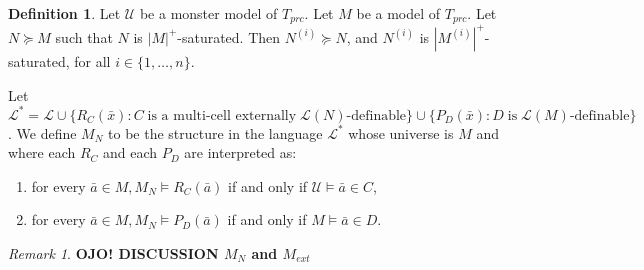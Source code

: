 \documentclass[12pt]{article}
\theoremstyle{definition}
\newtheorem{defi}[thm]{Definition}
\theoremstyle{mystyle}
\theoremstyle{remark}
\newtheorem{rem}[thm]{Remark}
\newcommand{\clos}[2]{#1^{(#2)}}
\begin{document}
\begin{defi} \label{ShelahExpPRC}
Let $\mathcal{U}$ be a monster model of $T_{prc}$. Let $M$ be a
model of $T_{prc}$. Let $N \succeq M$ such that $N$ is
$|M|^+$-saturated. Then $\clos{N}{i}\succeq N$, and $\clos{N}{i}$
is $|\clos{M}{i}|^+$-saturated, for all $i \in \{1, \ldots, n\}$.

Let $\mathcal{L}^* = \mathcal{L} \cup  \{R_C(\bar{x}) : C \; \mbox{is a multi-cell externally} \; \mathcal{L}(N)\mbox{-definable}\} \cup \{P_D(\bar{x}) : D \; \mbox{is} \; \mathcal{L}(M)\mbox{-definable}\}$.
We define $M_N$ to be the structure in the language $\mathcal{L}^*$
whose universe is $M$ and where each $R_C$ and each $P_D$ are interpreted as:
\begin{enumerate}
\item for every $\bar{a} \in M, M_N \models R_C(\bar{a})$ if and only if $\mathcal{U} \models \bar{a} \in C$,
\item for every $\bar{a} \in M, M_N \models P_D(\bar{a})$ if and only if $M \models \bar{a} \in D$.
\end{enumerate}

\end{defi}

\begin{rem}
\textbf{OJO! DISCUSSION $M_N$ and $M_{ext}$}
\end{rem}
\end{document}

